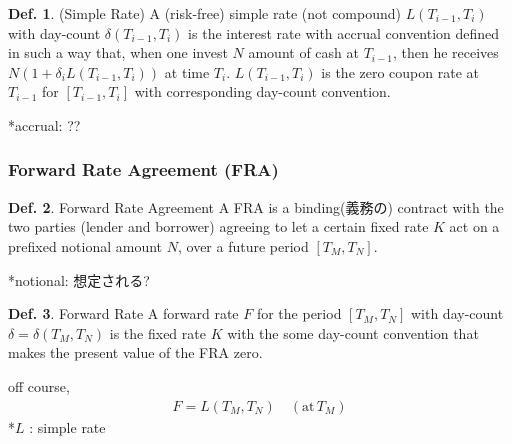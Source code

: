 \documentclass[a4paper,11pt]{jsarticle}
\theoremstyle{definition}
\newtheorem{definition}{Def.}[subsection]
\begin{document}
\begin{definition}{(Simple Rate)}
  A (risk-free) simple rate (not compound) $L(T_{i-1},T_i)$
  with day-count $\delta(T_{i-1},T_i)$ is the interest rate with
  accrual convention defined in such a way that, when one invest
  $N$ amount of cash at $T_{i-1}$, then he receives
  $N(1+\delta_i L(T_{i-1},T_i))$ at time $T_i$.
  $L(T_{i-1},T_i)$ is the zero coupon rate at $T_{i-1}$
  for $[T_{i-1},T_i]$ with corresponding day-count convention.
\end{definition}
*accrual: ??

\subsubsection{Forward Rate Agreement (FRA)}
\begin{definition}{Forward Rate Agreement}
  A FRA is a binding(義務の) contract with the two parties
  (lender and borrower) agreeing to let a certain fixed rate $K$
  act on a prefixed notional amount $N$, over a future period
  $[T_M, T_N]$.
\end{definition}
*notional: 想定される?

\begin{definition}{Forward Rate}
  A forward rate $F$ for the period $[T_M,T_N]$ with day-count
  $\delta=\delta(T_M,T_N)$ is the fixed rate $K$ with the some
  day-count convention that makes the present value of the FRA zero.
\end{definition}

off course,
\begin{align}
  F=L(T_M, T_N) \quad (\mbox{at} \, T_M)
\end{align}
*$L$ : simple rate
\end{document}
